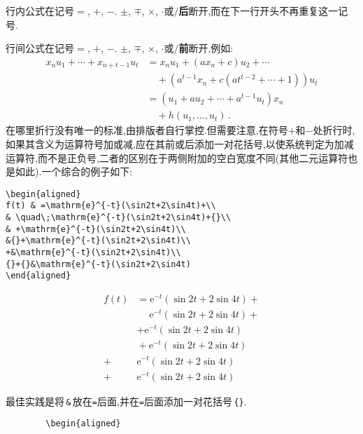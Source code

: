 \documentclass[a4paper]{article}
\newcommand{\mpunct}[1]{\,#1}                         %
\begin{document}
\begin{compactitem}[\hspace{1.02em}$\bullet$]
	\begin{compactenum}
		\item 行内公式在记号$=$, $+$, $-$. $\pm$, $\mp$, $\times$, $\cdot$或$/$\textbf{后}断开,而在下一行开头不再重复这一记号.
		\item 行间公式在记号$=$, $+$, $-$. $\pm$, $\mp$, $\times$, $\cdot$或$/$\textbf{前}断开,例如:
		$$
		\begin{aligned}
		x_{n} u_{1}+\cdots+x_{n+t-1} u_{t}&= x_{n} u_{1}+\left(a x_{n}+c\right) u_{2}+\cdots \\
		&\quad {}+\left(a^{t-1} x_{n}+c(a t^{t-2}+\cdots+1)\right) u_{t} \\
		&=\left(u_{1}+a u_{2}+\cdots+a^{t-1} u_{t}\right) x_{n}\\
		& \quad{}+ h\left(u_{1}, \ldots, u_{t}\right)\mpunct{.}
		\end{aligned}
		$$
		在哪里折行没有唯一的标准,由排版者自行掌控.但需要注意,在符号$+$和$-$处折行时,如果其含义为运算符号加或减,应在其前或后添加一对花括号,以使系统判定为加减运算符,而不是正负号,二者的区别在于两侧附加的空白宽度不同(其他二元运算符也是如此).一个综合的例子如下:\eop
		\begin{verbatim}
\begin{aligned}
f(t) & =\mathrm{e}^{-t}(\sin2t+2\sin4t)+\\
& \quad\;\mathrm{e}^{-t}(\sin2t+2\sin4t)+{}\\
& +\mathrm{e}^{-t}(\sin2t+2\sin4t)\\
&{}+\mathrm{e}^{-t}(\sin2t+2\sin4t)\\
+&\mathrm{e}^{-t}(\sin2t+2\sin4t)\\
{}+{}&\mathrm{e}^{-t}(\sin2t+2\sin4t)
\end{aligned}
		\end{verbatim}
		$$
		\begin{aligned}
			f(t) & =\mathrm{e}^{-t}(\sin2t+2\sin4t)+\\
				 & \quad\;\mathrm{e}^{-t}(\sin2t+2\sin4t)+{}\\
				 & +\mathrm{e}^{-t}(\sin2t+2\sin4t)\\
				 &{}+\mathrm{e}^{-t}(\sin2t+2\sin4t)\\
			    +&\mathrm{e}^{-t}(\sin2t+2\sin4t)\\
			{}+{}&\mathrm{e}^{-t}(\sin2t+2\sin4t)
		\end{aligned}
		$$
	\end{compactenum}
	最佳实践是将\,\verb|&|\,放在\texttt{=}后面,并在\texttt{=}后面添加一对花括号\,\verb|{}|.\eop
	\begin{verbatim}
		\begin{aligned}

\end{verbatim}
\end{compactitem}
\end{document}
